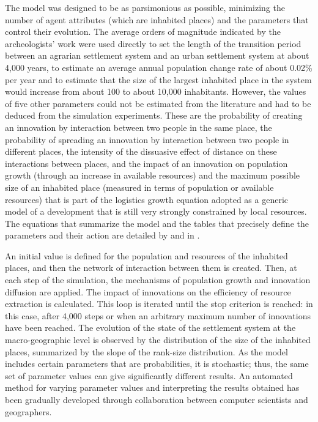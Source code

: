 \documentclass[10pt]{article}
\begin{document}
The model was designed to be as parsimonious as possible, minimizing the number of agent attributes (which are inhabited places) and the parameters that control their evolution. The average orders of magnitude indicated by the archeologists’ work were used directly to set the length of the transition period between an agrarian settlement system and an urban settlement system at about 4,000 years, to estimate an average annual population change rate of about 0.02\% per year and to estimate that the size of the largest inhabited place in the system would increase from about 100 to about 10,000 inhabitants. However, the values of five other parameters could not be estimated from the literature and had to be deduced from the simulation experiments. These are the probability of creating an innovation by interaction between two people in the same place, the probability of spreading an innovation by interaction between two people in different places, the intensity of the dissuasive effect of distance on these interactions between places, and the impact of an innovation on population growth (through an increase in available resources) and the maximum possible size of an inhabited place (measured in terms of population or available resources) that is part of the logistics growth equation adopted as a generic model of a development that is still very strongly constrained by local resources. The equations that summarize the model and the tables that precisely define the parameters and their action are detailed by \cite{schmitt2014modelisation} and \citep[pp. 21–34]{schmitt2017simpoplocal} in \cite{pumain2017urban}.

An initial value is defined for the population and resources of the inhabited places, and then the network of interaction between them is created. Then, at each step of the simulation, the mechanisms of population growth and innovation diffusion are applied. The impact of innovations on the efficiency of resource extraction is calculated. This loop is iterated until the stop criterion is reached: in this case, after 4,000 steps or when an arbitrary maximum number of innovations have been reached. The evolution of the state of the settlement system at the macro-geographic level is observed by the distribution of the size of the inhabited places, summarized by the slope of the rank-size distribution. As the model includes certain parameters that are probabilities, it is stochastic; thus, the same set of parameter values can give significantly different results. An automated method for varying parameter values and interpreting the results obtained has been gradually developed through collaboration between computer scientists and geographers.
\end{document}
